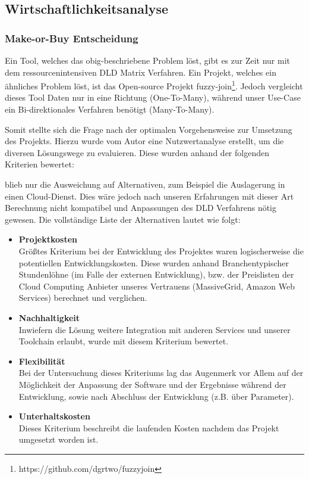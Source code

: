 \subsection{Wirtschaftlichkeitsanalyse}
\subsubsection{Make-or-Buy Entscheidung}
Ein Tool, welches das obig-beschriebene Problem löst, gibt es zur Zeit nur mit dem
ressourcenintensiven DLD Matrix Verfahren. Ein Projekt, welches ein ähnliches
Problem löst, ist das Open-source Projekt fuzzy-join\footnote{https://github.com/dgrtwo/fuzzyjoin}.
Jedoch vergleicht dieses Tool Daten nur in eine Richtung (One-To-Many), während unser
Use-Case ein Bi-direktionales Verfahren benötigt (Many-To-Many).\par

Somit stellte sich die Frage nach der optimalen Vorgehensweise zur Umsetzung des
Projekts. Hierzu wurde vom Autor eine Nutzwertanalyse erstellt, um die diversen
Lösungswege zu evaluieren. Diese wurden anhand der folgenden Kriterien bewertet:

blieb nur die Ausweichung auf Alternativen, zum Beispiel die Auslagerung in
einen Cloud-Dienst. Dies wäre jedoch nach unseren Erfahrungen mit dieser Art
Berechnung nicht kompatibel und Anpassungen des DLD Verfahrens nötig gewesen.
Die vollständige Liste der Alternativen lautet wie folgt:

\begin{itemize}
    \item \textbf{Projektkosten}\\
    Größtes Kriterium bei der Entwicklung des Projektes waren logischerweise die
     potentiellen Entwicklungskosten. Diese wurden anhand Branchentypischer Stundenlöhne
     (im Falle der externen Entwicklung), bzw. der Preislisten der Cloud Computing
     Anbieter unseres Vertrauens (MassiveGrid, Amazon Web Services) berechnet und verglichen.

    \item \textbf{Nachhaltigkeit}\\
    Inwiefern die Lösung weitere Integration mit anderen Services und unserer
    Toolchain erlaubt, wurde mit diesem Kriterium bewertet.

    \item \textbf{Flexibilität}\\
    Bei der Untersuchung dieses Kriteriums lag das Augenmerk vor Allem auf der
    Möglichkeit der Anpassung der Software und der Ergebnisse während der Entwicklung,
    sowie nach Abschluss der Entwicklung (z.B. über Parameter).

    \item \textbf{Unterhaltskosten}\\
    Dieses Kriterium beschreibt die laufenden Kosten nachdem das Projekt umgesetzt worden ist.
\end{itemize}



